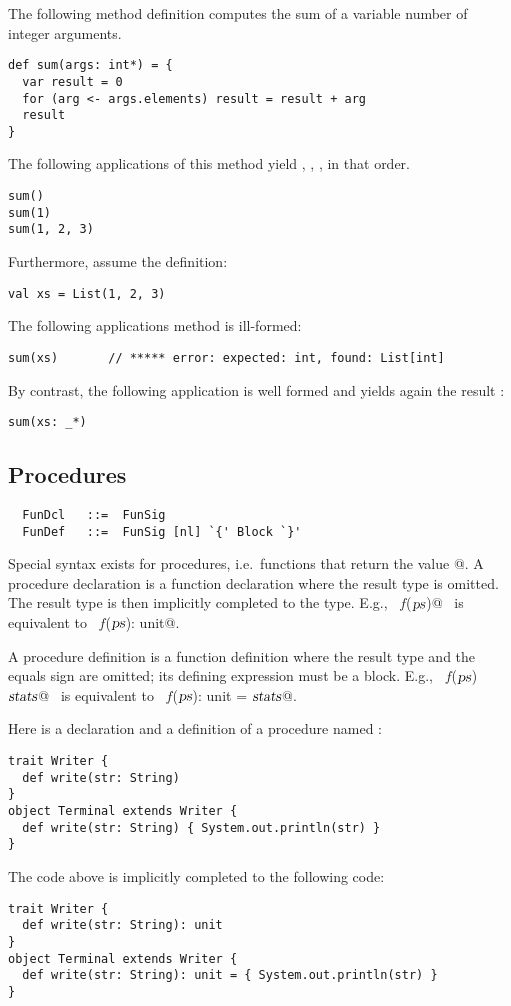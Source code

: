 \example The following method definition computes the sum of a variable number
of integer arguments.
\begin{lstlisting}
def sum(args: int*) = {
  var result = 0
  for (arg <- args.elements) result = result + arg
  result
}
\end{lstlisting}
The following applications of this method yield , ,
, in that order.
\begin{lstlisting}
sum()
sum(1)
sum(1, 2, 3)
\end{lstlisting}
Furthermore, assume the definition:
\begin{lstlisting}
val xs = List(1, 2, 3)
\end{lstlisting}
The following applications method \lstinline@sum@ is ill-formed:
\begin{lstlisting}
sum(xs)       // ***** error: expected: int, found: List[int]
\end{lstlisting}
By contrast, the following application is well formed and yields again
the result :
\begin{lstlisting}
sum(xs: _*) 
\end{lstlisting}

\subsection{Procedures}\label{sec:procedures}

\syntax\begin{lstlisting} 
  FunDcl   ::=  FunSig
  FunDef   ::=  FunSig [nl] `{' Block `}'
\end{lstlisting}

Special syntax exists for procedures, i.e.\ functions that return the
\verb@unit@ value \verb@{}@. 
A procedure declaration is a function declaration where the result type
is omitted. The result type is then implicitly completed to the
\verb@unit@ type. E.g., ~\lstinline@def $f$($\mbox{\sl ps}$)@~ is equivalent to
~\lstinline@def $f$($\mbox{\sl ps}$): unit@.

A procedure definition is a function definition where the result type
and the equals sign are omitted; its defining expression must be a block.
E.g., ~\lstinline@def $f$($\mbox{\sl ps}$) {$\mbox{\sl stats}$}@~ is equivalent to
~\lstinline@def $f$($\mbox{\sl ps}$): unit = {$\mbox{\sl stats}$}@.

\example Here is a declaration and a definition of a procedure named \lstinline@write@: 
\begin{lstlisting}
trait Writer { 
  def write(str: String)
}
object Terminal extends Writer {
  def write(str: String) { System.out.println(str) }
}
\end{lstlisting}
The code above is implicitly completed to the following code:
\begin{lstlisting}
trait Writer { 
  def write(str: String): unit
}
object Terminal extends Writer {
  def write(str: String): unit = { System.out.println(str) }
}
\end{lstlisting}


